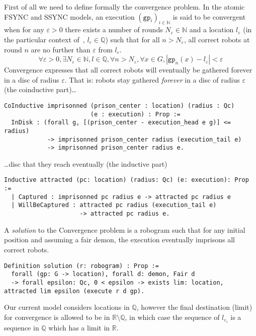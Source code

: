 \documentclass[11pt,a4]{llncs}
\newcommand{\x}{\xspace}
\newcommand{\setQ}{\ensuremath{\mathbb{Q}}\x}
\newcommand{\gp}{\ensuremath{\texttt{gp}\x}}
\renewcommand{\epsilon}{\varepsilon}
\begin{document}
First of all we need to define formally the convergence problem.
In the atomic FSYNC and SSYNC models,
an execution $(\gp_i)_{i\in\mathbb{N}}$ is said to be convergent when
for any $\epsilon > 0$ there exists a number of
rounds
$N_\epsilon\in\mathbb{N}$ and a location $l_\epsilon$ (in the
particular context of~\cite{bouzid10tcs}, $l_\epsilon\in\setQ$)
such that for all $n>N_\epsilon$, all correct robots at round $n$
are no further than $\epsilon$ from $l_\epsilon$.
\[\forall \epsilon >0, \exists N_\epsilon\in\mathbb{N}, l\in\setQ,
\forall n>N_\epsilon, \forall x\in G, |\gp_n(x)-l_\epsilon|<\epsilon\]
Convergence expresses that all correct robots will eventually be
gathered forever in a disc of radius $\epsilon$.
That is: robots stay
gathered \emph{forever} in a disc of radius $\epsilon$ (the
coinductive part)\ldots \begin{lstlisting}
CoInductive imprisonned (prison_center : location) (radius : Qc)
                        (e : execution) : Prop :=
  InDisk : (forall g, [(prison_center - execution_head e g)] <= radius)
            -> imprisonned prison_center radius (execution_tail e)
            -> imprisonned prison_center radius e.
\end{lstlisting}
\ldots disc that they reach eventually (the inductive part)
\begin{lstlisting}
Inductive attracted (pc: location) (radius: Qc) (e: execution): Prop :=
  | Captured : imprisonned pc radius e -> attracted pc radius e
  | WillBeCaptured : attracted pc radius (execution_tail e) 
                     -> attracted pc radius e.
\end{lstlisting}
A \emph{solution} to the Convergence problem is a robogram such that for any initial position and assuming a fair demon, the
execution eventually imprisons all correct robots.
\begin{lstlisting}
Definition solution (r: robogram) : Prop := 
  forall (gp: G -> location), forall d: demon, Fair d
  -> forall epsilon: Qc, 0 < epsilon -> exists lim: location, attracted lim epsilon (execute r d gp).
\end{lstlisting}

\begin{remark}\label{rem:limitR}
  Our current model considers locations in \setQ, however the final
  destination (limit) for convergence is allowed to be in $\mathbb{R} \setminus \setQ$, in which case the
  sequence of $l_{\epsilon_i}$ is a sequence in $\setQ$ which has a
  limit in $\mathbb{R}$.
\end{remark}
\end{document}
